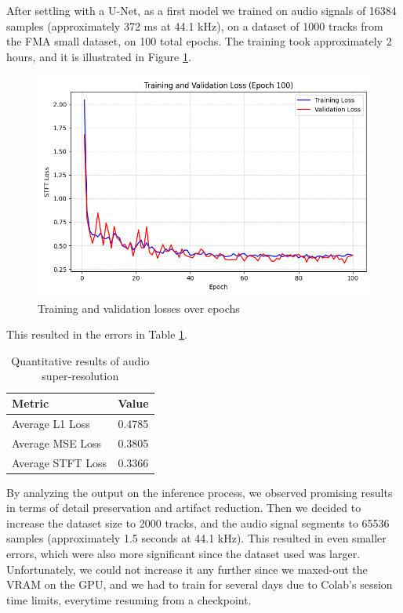\documentclass{article}
\begin{document}
After settling with a U-Net, as a first model we trained on audio signals of 16384 samples (approximately 372 ms at 44.1 kHz), on a dataset of 1000 tracks from the FMA small dataset, on 100 total epochs.
The training took approximately 2 hours, and it is illustrated in Figure \ref{fig:training2}.
\begin{figure}[!htb]
    \centering
    \includegraphics[width=1\linewidth]{images/training2.png}
    \vspace{-0.7cm} %
    \caption{Training and validation losses over epochs}
    \label{fig:training2}
\end{figure}
This resulted in the errors in Table \ref{tab:results2}.
\begin{table}[!htb]
    \centering
    \begin{tabular}{lc}
        \toprule
        \textbf{Metric} & \textbf{Value} \\
        \midrule
        Average L1 Loss & 0.4785 \\
        Average MSE Loss & 0.3805 \\
        Average STFT Loss & 0.3366 \\
        \bottomrule
    \end{tabular}
    \caption{Quantitative results of audio super-resolution}
    \label{tab:results2}
\end{table}
By analyzing the output on the inference process, we observed promising results in terms of detail preservation and artifact reduction.
Then we decided to increase the dataset size to 2000 tracks, and the audio signal segments to 65536 samples (approximately 1.5 seconds at 44.1 kHz).
This resulted in even smaller errors, which were also more significant since the dataset used was larger.
Unfortunately, we could not increase it any further since we maxed-out the VRAM on the GPU, and we had to train for several days due to Colab's session time limits, everytime resuming from a checkpoint.




\end{document}
